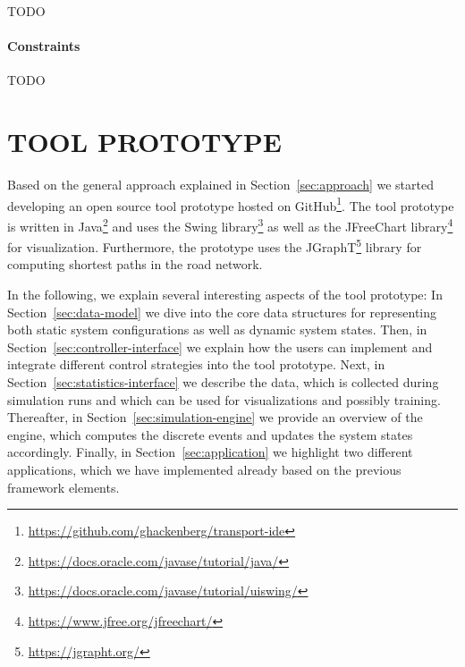 \documentclass[a4paper,twoside]{article}
\begin{document}
	TODO
	
	\paragraph{Constraints}
	
	TODO
	
	\section{\uppercase{Tool prototype}}
	\label{sec:tool-prototype}
	
	Based on the general approach explained in Section~\ref{sec:approach} we started developing an open source tool prototype hosted on GitHub\footnote{\url{https://github.com/ghackenberg/transport-ide}}.
	The tool prototype is written in Java\footnote{\url{https://docs.oracle.com/javase/tutorial/java/}} and uses the Swing library\footnote{\url{https://docs.oracle.com/javase/tutorial/uiswing/}} as well as the JFreeChart library\footnote{\url{https://www.jfree.org/jfreechart/}} for visualization.
	Furthermore, the prototype uses the JGraphT\footnote{\url{https://jgrapht.org/}} library for computing shortest paths in the road network.
	
	In the following, we explain several interesting aspects of the tool prototype:
	In Section~\ref{sec:data-model} we dive into the core data structures for representing both static system configurations as well as dynamic system states.
	Then, in Section~\ref{sec:controller-interface} we explain how the users can implement and integrate different control strategies into the tool prototype.
	Next, in Section~\ref{sec:statistics-interface} we describe the data, which is collected during simulation runs and which can be used for visualizations and possibly training.
	Thereafter, in Section~\ref{sec:simulation-engine} we provide an overview of the engine, which computes the discrete events and updates the system states accordingly.
	Finally, in Section~\ref{sec:application} we highlight two different applications, which we have implemented already based on the previous framework elements.
	
	
	
\end{document}
